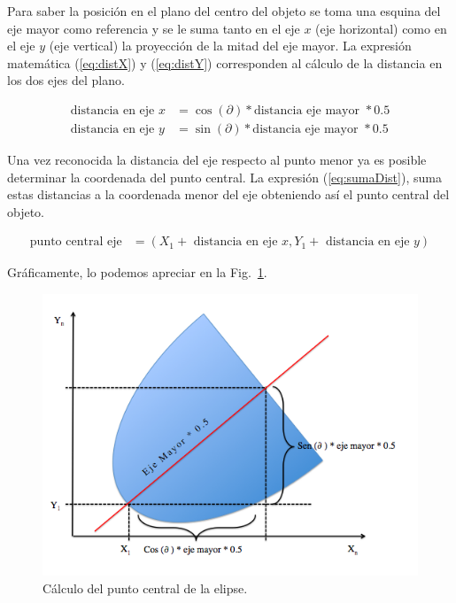 Para saber la posición en el plano del centro del objeto se toma una
esquina del eje mayor como referencia y se le suma tanto en el eje $x$
(eje horizontal) como en el eje $y$ (eje vertical) la proyección de la
mitad del eje mayor. La expresión matemática (\ref{eq:distX}) y
(\ref{eq:distY}) corresponden al cálculo de la distancia en los dos
ejes del plano.

\begin{align}
  \text{distancia en eje } x & = \cos{\left(\partial\right)} * \text{
  distancia eje mayor } * 0.5 \label{eq:distX}\\
  \text{distancia en eje } y & = \sin{\left(\partial\right)} * \text{
  distancia eje mayor } * 0.5 \label{eq:distY}
\end{align}

Una vez reconocida la distancia del eje respecto al punto menor ya es
posible determinar la coordenada del punto central. La expresión
(\ref{eq:sumaDist}), suma estas distancias a la coordenada menor del
eje obteniendo así el punto central del objeto.

\begin{align}
  \text{punto central eje} & = \left(X_1 + \text{ distancia en eje }
  x, Y_1 + \text{ distancia en eje } y\right) \label{eq:sumaDist}
\end{align}

Gráficamente, lo podemos apreciar en la Fig.~\ref{img:puntoCentral}.

\begin{figure}[hb!]
  \begin{center}
    \includegraphics[scale=.5]{image/puntoCentral}
  \end{center}
  \caption{Cálculo del punto central de la
  elipse.}\label{img:puntoCentral}
\end{figure}


